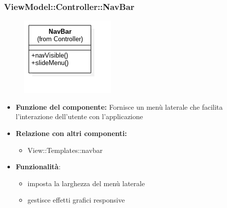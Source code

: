  \subsubsection{ViewModel::Controller::NavBar}
 \begin{figure}[h!]
\begin{center}
	\includegraphics[scale=0.4]{../images/ViewModel/Controller/NavBar.png}
\end{center}
\end{figure}
 \begin{itemize}
 \item\textbf{Funzione del componente:} Fornisce un menù laterale che facilita l'interazione dell'utente con l'applicazione
 \item\textbf{Relazione con altri componenti:}
 \begin{itemize}
 	\item View::Templates::navbar
 \end{itemize}
 \item\textbf{Funzionalità}:
 	\begin{itemize}
 		\item{} imposta la larghezza del menù laterale\\
		\item{} gestisce effetti grafici responsive\\
 	\end{itemize}
 \end{itemize}
\newpage
 
